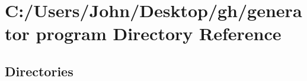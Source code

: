 \section{C\+:/\+Users/\+John/\+Desktop/gh/generator program Directory Reference}
\label{dir_4c13acdd5cd57b0bc7bccffb660a4b2d}
\subsection*{Directories}
\begin{DoxyCompactItemize}
\end{DoxyCompactItemize}
